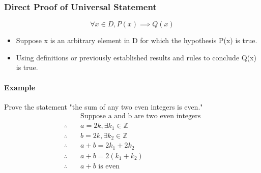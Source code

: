\subsubsection*{Direct Proof of Universal Statement}
\begin{equation*}
    \forall x \in D, P(x) \implies Q(x)
\end{equation*}
\begin{itemize}
    \item Suppose x is an arbitrary element in D for which the hypothesis P(x) is true.
    \item Using definitions or previously established results and rules to conclude Q(x) is true.
\end{itemize}

\paragraph*{Example}
Prove the statement "the sum of any two even integers is even."
\begin{align*}
    &\text{Suppose a and b are two even integers}\\
    \therefore \quad & a = 2k, \exists k_1 \in \mathbb{Z}\\
    \therefore \quad & b = 2k, \exists k_2 \in \mathbb{Z}\\
    \therefore \quad & a + b = 2k_1 + 2k_2\\
    \therefore \quad & a + b = 2(k_1 + k_2)\\
    \therefore \quad & a + b \text{ is even}
\end{align*}